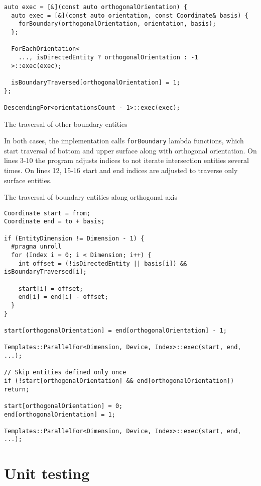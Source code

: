 \newpage
\begin{listing}[!ht]
\begin{verbatim}
auto exec = [&](const auto orthogonalOrientation) {
  auto exec = [&](const auto orientation, const Coordinate& basis) {
    forBoundary(orthogonalOrientation, orientation, basis);
  };

  ForEachOrientation<
    ..., isDirectedEntity ? orthogonalOrientation : -1
  >::exec(exec);

  isBoundaryTraversed[orthogonalOrientation] = 1;
};

DescendingFor<orientationsCount - 1>::exec(exec);
\end{verbatim}
\caption{The traversal of other boundary entities}
\label{code:other-boundaries}
\end{listing}

In both cases, the implementation calls \texttt{forBoundary} lambda functions, which start traversal of bottom and upper surface along with orthogonal orientation.
On lines 3-10 the program adjusts indices to not iterate intersection entities several times.
On lines 12, 15-16 start and end indices are adjusted to traverse only surface entities.

\begin{listing}[!h]
\caption{The traversal of boundary entities along orthogonal axis}
\begin{verbatim}
Coordinate start = from;
Coordinate end = to + basis;

if (EntityDimension != Dimension - 1) {
  #pragma unroll
  for (Index i = 0; i < Dimension; i++) {
    int offset = (!isDirectedEntity || basis[i]) && isBoundaryTraversed[i];

    start[i] = offset;
    end[i] = end[i] - offset;
  }
}

start[orthogonalOrientation] = end[orthogonalOrientation] - 1;

Templates::ParallelFor<Dimension, Device, Index>::exec(start, end, ...);

// Skip entities defined only once
if (!start[orthogonalOrientation] && end[orthogonalOrientation]) return;

start[orthogonalOrientation] = 0;
end[orthogonalOrientation] = 1;

Templates::ParallelFor<Dimension, Device, Index>::exec(start, end, ...);
\end{verbatim}
\end{listing}

\section{Unit testing}


